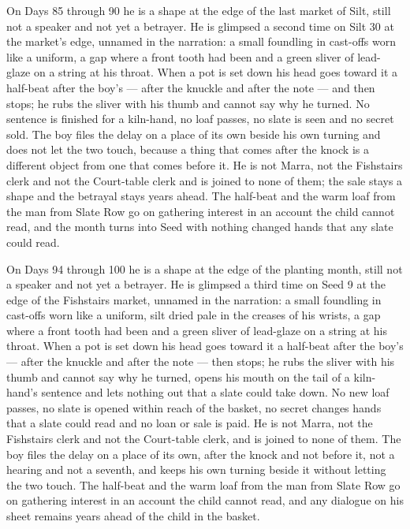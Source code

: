 \documentclass{design/chronicle}
\begin{document}
{On Days 85 through 90 he is a shape at the edge of the last market of Silt, still not a speaker and not yet a betrayer. He is glimpsed a second time on Silt 30 at the market’s edge, unnamed in the narration: a small foundling in cast-offs worn like a uniform, a gap where a front tooth had been and a green sliver of lead-glaze on a string at his throat. When a pot is set down his head goes toward it a half-beat after the boy’s --- after the knuckle and after the note --- and then stops; he rubs the sliver with his thumb and cannot say why he turned. No sentence is finished for a kiln-hand, no loaf passes, no slate is seen and no secret sold. The boy files the delay on a place of its own beside his own turning and does not let the two touch, because a thing that comes after the knock is a different object from one that comes before it. He is not Marra, not the Fishstairs clerk and not the Court-table clerk and is joined to none of them; the sale stays a shape and the betrayal stays years ahead. The half-beat and the warm loaf from the man from Slate Row go on gathering interest in an account the child cannot read, and the month turns into Seed with nothing changed hands that any slate could read.

On Days 94 through 100 he is a shape at the edge of the planting month, still not a speaker and not yet a betrayer. He is glimpsed a third time on Seed 9 at the edge of the Fishstairs market, unnamed in the narration: a small foundling in cast-offs worn like a uniform, silt dried pale in the creases of his wrists, a gap where a front tooth had been and a green sliver of lead-glaze on a string at his throat. When a pot is set down his head goes toward it a half-beat after the boy’s --- after the knuckle and after the note --- then stops; he rubs the sliver with his thumb and cannot say why he turned, opens his mouth on the tail of a kiln-hand’s sentence and lets nothing out that a slate could take down. No new loaf passes, no slate is opened within reach of the basket, no secret changes hands that a slate could read and no loan or sale is paid. He is not Marra, not the Fishstairs clerk and not the Court-table clerk, and is joined to none of them. The boy files the delay on a place of its own, after the knock and not before it, not a hearing and not a seventh, and keeps his own turning beside it without letting the two touch. The half-beat and the warm loaf from the man from Slate Row go on gathering interest in an account the child cannot read, and any dialogue on his sheet remains years ahead of the child in the basket.

}
\end{document}
